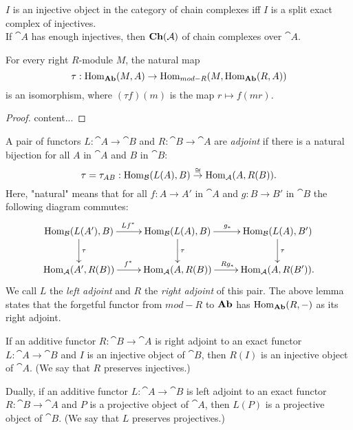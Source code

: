 \begin{exercise}
	$I$ is an injective object in the category of chain complexes iff $I$ is a split exact complex of injectives. \\
	If $\cat{A}$ has enough injectives, then $\textrm{\textup{\textbf{Ch}}}(\mathcal{A})$ of chain complexes over $\cat{A}$.
\end{exercise}

\begin{lemma}
	For every right $R$-module $M$, the natural map
	$$\tau:\operatorname{Hom}_{\textrm{\textup{\textbf{Ab}}}}(M,A)\rightarrow\operatorname{Hom}_{mod-R}(M,\operatorname{Hom}_{\textrm{\textup{\textbf{Ab}}}}(R,A))$$
	is an isomorphism, where $(\tau f)(m)$ is the map $r\mapsto f(mr)$.
\end{lemma}

\begin{proof}
	content...
\end{proof}

\begin{definition}
	A pair of functors $L:\cat{A}\rightarrow\cat{B}$ and $R:\cat{B}\rightarrow\cat{A}$ are \textit{adjoint} if there is a natural bijection for all $A$ in $\cat{A}$ and $B$ in $\cat{B}$:
	$$\tau = \tau_{AB}:\operatorname{Hom}_{\mathcal{B}}(L(A),B) \overset{\cong}{\rightarrow} \operatorname{Hom}_{\mathcal{A}}(A,R(B)).$$
	Here, "natural" means that for all $f:A\rightarrow A'$ in $\cat{A}$ and $g:B\rightarrow B'$ in $\cat{B}$ the following diagram commutes:
	\begin{align*}
		\xymatrix{
			\Hom_{\cat{B}}(L(A'),B) \ar[r]^{Lf^*} \ar[d]^{\tau} &\Hom_{\cat{B}}(L(A),B) \ar[r]^{g_*} \ar[d]^{\tau} &\Hom_{\cat{B}}(L(A),B') \ar[d]^{\tau} \\
			\Hom_{\cat{A}}(A',R(B)) \ar[r]^{f^*} &\Hom_{\cat{A}}(A,R(B)) \ar[r]^{Rg_*} &\Hom_{\cat{A}}(A,R(B')).
		}
	\end{align*}
	We call $L$ the \textit{left adjoint} and $R$ the \textit{right adjoint} of this pair.
	The above lemma states that the forgetful functor from $mod-R$ to $\textrm{\textup{\textbf{Ab}}}$ has $\operatorname{Hom}_{\textrm{\textup{\textbf{Ab}}}}(R,-)$ as its right adjoint.
\end{definition}

\begin{proposition}\label{PresInj}
	If an additive functor $R:\cat{B}\rightarrow\cat{A}$ is right adjoint to an exact functor $L:\cat{A}\rightarrow\cat{B}$ and $I$ is an injective object of $\cat{B}$, then $R(I)$ is an injective object of $\cat{A}$. (We say that $R$ preserves injectives.)
	
	Dually, if an additive functor $L:\cat{A}\rightarrow\cat{B}$ is left adjoint to an exact functor $R:\cat{B}\rightarrow\cat{A}$ and $P$ is a projective object of $\cat{A}$, then $L(P)$ is a projective object of $\cat{B}$. (We say that $L$ preserves projectives.)
\end{proposition}

